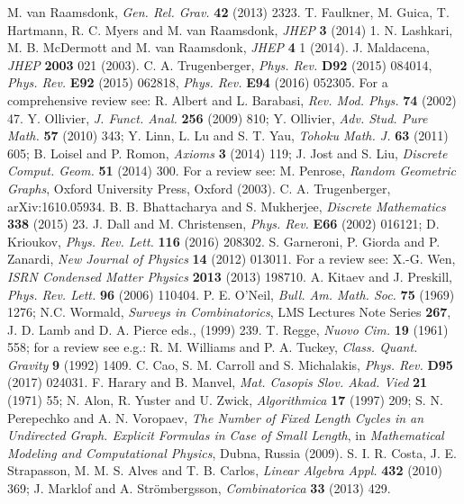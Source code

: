 \documentclass[twocolumn,
preprintnumbers,amsmath,amssymb]{revtex4}
\begin{document}
\begin{references}
 M. van Raamsdonk, {\it Gen. Rel. Grav.} {\bf 42} (2013) 2323. 
 T. Faulkner, M. Guica, T. Hartmann, R. C. Myers and M. van Raamsdonk, {\it JHEP} {\bf 3} (2014) 1. 
 N. Lashkari, M. B. McDermott and M. van Raamsdonk, {\it JHEP} {\bf 4} 1 (2014). 
 J. Maldacena, {\it JHEP} {\bf 2003}  021 (2003).
C. A. Trugenberger, {\it Phys. Rev.} {\bf D92} (2015) 084014, {\it Phys. Rev.} {\bf E92} (2015) 062818, {\it Phys. Rev.} {\bf E94} (2016) 052305. 
For a comprehensive review see: R. Albert and L. Barabasi, {\it Rev. Mod. Phys.} {\bf 74} (2002) 47. 
Y. Ollivier, {\it J. Funct. Anal.} {\bf 256} (2009) 810; Y. Ollivier, {\it Adv. Stud. Pure Math.} {\bf 57} (2010) 343; Y. Linn, L. Lu and S. T. Yau, {\it Tohoku Math. J.} {\bf 63} (2011) 605; B. Loisel and P. Romon, {\it Axioms} {\bf 3} (2014) 119; J. Jost and S. Liu, {\it Discrete Comput. Geom.} {\bf 51} (2014) 300. 
For a review see: M. Penrose, {\it Random Geometric Graphs}, Oxford University Press, Oxford (2003). 
C. A. Trugenberger, arXiv:1610.05934.
B. B. Bhattacharya and S. Mukherjee, {\it Discrete Mathematics} {\bf 338} (2015) 23. 
J. Dall and M. Christensen, {\it Phys. Rev. } {\bf E66} (2002) 016121; D. Krioukov, {\it Phys. Rev. Lett.} {\bf 116} (2016) 208302. 
S. Garneroni, P. Giorda and P. Zanardi, {\it New Journal of Physics} {\bf 14} (2012) 013011. 
 For a review see: X.-G. Wen, {\it ISRN Condensed Matter Physics} {\bf 2013} (2013) 198710.
 A. Kitaev and J. Preskill, {\it Phys. Rev. Lett.} {\bf 96} (2006) 110404. 
P. E. O'Neil, {\it Bull. Am. Math. Soc.} {\bf 75} (1969) 1276; N.C. Wormald, {\it Surveys in Combinatorics}, LMS Lectures Note Series {\bf 267}, J. D. Lamb and D. A. Pierce eds., (1999) 239. 
T. Regge, {\it Nuovo Cim.} {\bf 19} (1961) 558; for a review see e.g.: R. M. Williams and P. A. Tuckey, {\it Class. Quant. Gravity} {\bf 9} (1992) 1409. 
C. Cao, S. M. Carroll and S. Michalakis, {\it Phys. Rev.} {\bf D95} (2017) 024031. 
F. Harary and B. Manvel, {\it Mat. Casopis Slov. Akad. Vied} {\bf 21} (1971) 55; N. Alon, R. Yuster and U. Zwick, {\it Algorithmica} {\bf 17} (1997) 209; S. N. Perepechko and A. N. Voropaev, {\it The Number of Fixed Length Cycles in an Undirected Graph. Explicit Formulas in Case of Small Length}, in {\it Mathematical Modeling and Computational Physics}, Dubna, Russia (2009). 
S. I. R. Costa, J. E. Strapasson, M. M. S. Alves and T. B. Carlos, {\it Linear Algebra Appl.} {\bf 432} (2010) 369; J. Marklof and A. Str\"ombergsson, {\it Combinatorica} {\bf 33} (2013) 429. 

\end{references}
\end{document}
